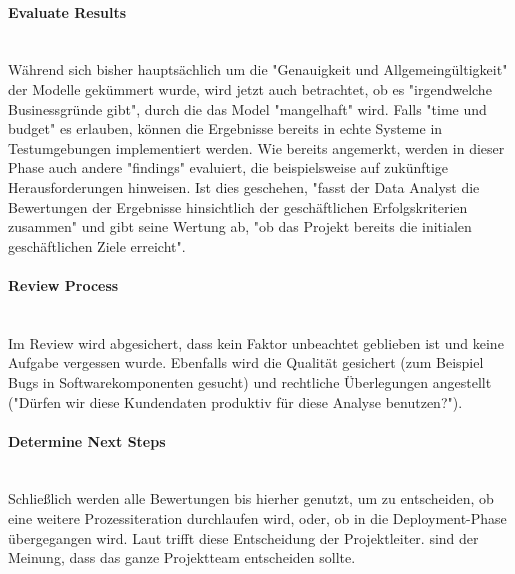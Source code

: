 \paragraph{Evaluate Results}\mbox{} \\
Während sich bisher hauptsächlich um die "Genauigkeit und Allgemeingültigkeit" der Modelle gekümmert wurde, wird jetzt auch betrachtet, ob es "irgendwelche Businessgründe gibt", durch die das Model "mangelhaft"\citep[S.~18; eigene Übersetzung]{shearer_crisp-dm_2000} wird. Falls "time und budget"\citep[S.~26]{chapman_crisp-dm_2000} es erlauben, können die Ergebnisse bereits in echte Systeme in Testumgebungen implementiert werden. Wie bereits angemerkt, werden in dieser Phase auch andere "findings" evaluiert, die beispielsweise auf zukünftige Herausforderungen hinweisen.\citep[S.~18]{shearer_crisp-dm_2000} Ist dies geschehen, "fasst der Data Analyst die Bewertungen der Ergebnisse hinsichtlich der geschäftlichen Erfolgskriterien zusammen" und gibt seine Wertung ab, "ob das Projekt bereits die initialen geschäftlichen Ziele erreicht"\citep[S.~18; eigene Übersetzung]{shearer_crisp-dm_2000}.

\paragraph{Review Process}\mbox{} \\
Im Review wird abgesichert, dass kein Faktor unbeachtet geblieben ist und keine Aufgabe vergessen wurde. Ebenfalls wird die Qualität gesichert (zum Beispiel Bugs in Softwarekomponenten gesucht) und rechtliche Überlegungen angestellt ("Dürfen wir diese Kundendaten produktiv für diese Analyse benutzen?").

\paragraph{Determine Next Steps}\mbox{} \\
Schließlich werden alle Bewertungen bis hierher genutzt, um zu entscheiden, ob eine weitere Prozessiteration durchlaufen wird, oder, ob in die Deployment-Phase übergegangen wird. Laut \citep[S.~18]{shearer_crisp-dm_2000} trifft diese Entscheidung der Projektleiter. \citep[S.~17]{chapman_crisp-dm_2000} sind der Meinung, dass das ganze Projektteam entscheiden sollte.

